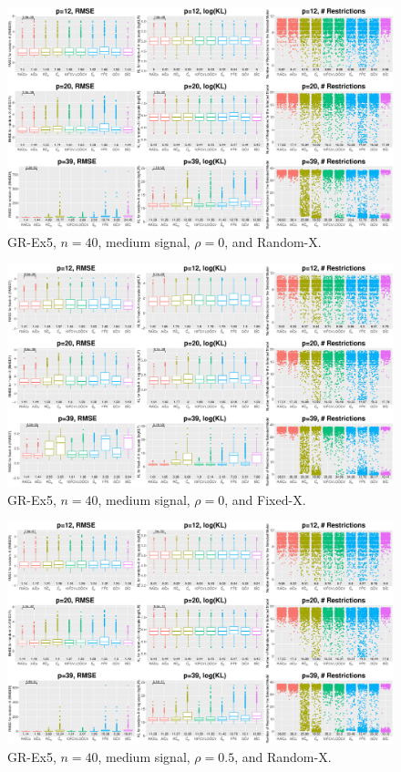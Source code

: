 \clearpage
\begin{figure}[!ht]
\centering
\includegraphics[width=\textwidth]{figures/supplement/randomx_GR-Ex5_n40_msnr_rho0.eps}
\caption{GR-Ex5, $n=40$, medium signal, $\rho=0$, and Random-X.}
\end{figure}
\begin{figure}[!ht]
\centering
\includegraphics[width=\textwidth]{figures/supplement/fixedx_GR-Ex5_n40_msnr_rho0.eps}
\caption{GR-Ex5, $n=40$, medium signal, $\rho=0$, and Fixed-X.}
\end{figure}
\clearpage
\begin{figure}[!ht]
\centering
\includegraphics[width=\textwidth]{figures/supplement/randomx_GR-Ex5_n40_msnr_rho05.eps}
\caption{GR-Ex5, $n=40$, medium signal, $\rho=0.5$, and Random-X.}
\end{figure}
